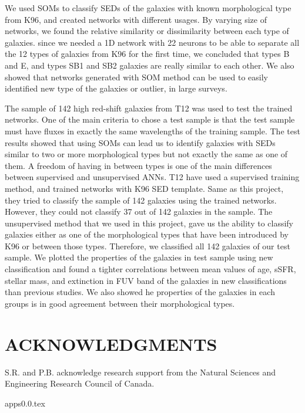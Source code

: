 \documentclass[useAMS,usenatbib]{mn2e}
\begin{document}
We used SOMs to classify SEDs of the galaxies with known morphological type from K96, and created networks with different usages.
By varying size of networks, we found the relative similarity or dissimilarity between each type of galaxies.
since we needed a 1D network with 22 neurons to be able to separate all the 12 types of galaxies from K96 for the first time, we concluded that types B and E, and types SB1 and SB2 galaxies are really similar to each other.
We also showed that networks generated with SOM method can be used to easily identified new type of the galaxies or outlier, in large surveys.

The sample of 142 high red-shift galaxies from T12 was used to test the trained networks.
One of the main criteria to chose a test sample is that the test sample must have fluxes in exactly the same wavelengths of the training sample.
The test results showed that using SOMs can lead us to identify galaxies with SEDs similar to two or more morphological types but not exactly the same as one of them.
A freedom of having in between types is one of the main differences between supervised and unsupervised ANNs.
T12  have used a supervised training method, and trained networks with K96 SED template.
Same as this project, they tried to classify the sample of 142 galaxies using the trained networks.
However, they could not classify 37 out of 142 galaxies in the sample.
The unsupervised method that we used in this project, gave us the ability to classify galaxies either as one of the morphological types that have been introduced by K96 or between those types. 
Therefore, we classified all 142 galaxies of our test sample.
We plotted the properties of the galaxies in test sample using new classification and found a tighter correlations between mean values of age, sSFR, stellar mass, and extinction in FUV band of the galaxies in new classifications than previous studies.
We also showed he properties of the galaxies in each groups is in good agreement between their morphological types.


\section*{ACKNOWLEDGMENTS}
S.R. and P.B. acknowledge research support from the Natural Sciences and Engineering Research Council of Canada. 



{apps0.0.tex}
\end{document}
